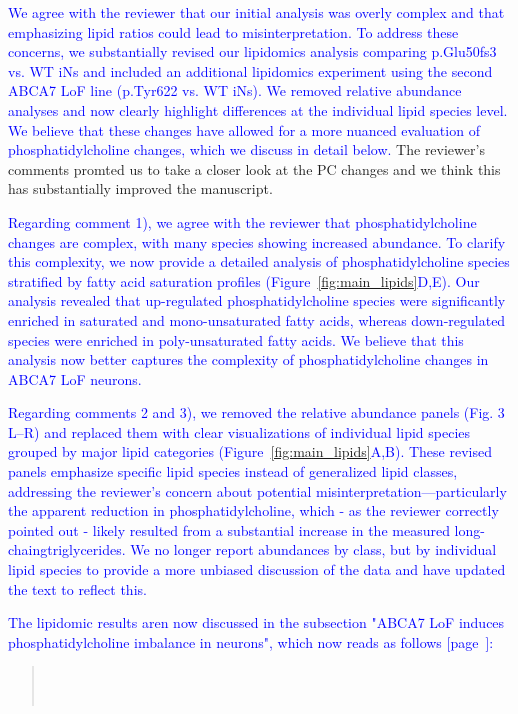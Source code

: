 \textcolor{blue}{We agree with the reviewer that our initial analysis was overly complex and that emphasizing lipid ratios could lead to misinterpretation. To address these concerns, we substantially revised our lipidomics analysis comparing p.Glu50fs3 vs. WT iNs and included an additional lipidomics experiment using the second ABCA7 LoF line (p.Tyr622 vs. WT iNs). We removed relative abundance analyses and now clearly highlight differences at the individual lipid species level. We believe that these changes have allowed for a more nuanced evaluation of phosphatidylcholine changes, which we discuss in detail below.}
The reviewer's comments promted us to take a closer look at the PC changes and we think this has substantially improved the manuscript.

\textcolor{blue}{Regarding comment 1), we agree with the reviewer that phosphatidylcholine changes are complex, with many species showing increased abundance. To clarify this complexity, we now provide a detailed analysis of phosphatidylcholine species stratified by fatty acid saturation profiles (Figure~\ref{fig:main_lipids}D,E). Our analysis revealed that up-regulated phosphatidylcholine species were significantly enriched in saturated and mono-unsaturated fatty acids, whereas down-regulated species were enriched in poly-unsaturated fatty acids. We believe that this analysis now better captures the complexity of phosphatidylcholine changes in ABCA7 LoF neurons.}

\textcolor{blue}{Regarding comments 2 and 3), we removed the relative abundance panels (Fig. 3 L–R) and replaced them with clear visualizations of individual lipid species grouped by major lipid categories (Figure~\ref{fig:main_lipids}A,B). These revised panels emphasize specific lipid species instead of generalized lipid classes, addressing the reviewer’s concern about potential misinterpretation—particularly the apparent reduction in phosphatidylcholine, which - as the reviewer correctly pointed out - likely resulted from a substantial increase in the measured long-chaingtriglycerides. We no longer report abundances by class, but by individual lipid species to provide a more unbiased discussion of the data and have updated the text to reflect this.}

\textcolor{blue}{The lipidomic results aren now discussed in the subsection "ABCA7 LoF induces phosphatidylcholine imbalance in neurons", which now reads as follows [page~\pageref{quoteA-label}]:}
\begin{quote}
	\quoteA\\\\
	\quoteB
\end{quote}

